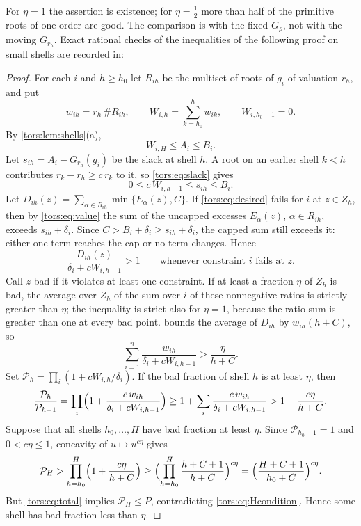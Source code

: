 For $\eta=1$ the assertion is existence; for $\eta=\tfrac12$ more than half of the
primitive roots of one order are good. The comparison is with the fixed $G_\rho$, not with
the moving $G_{r_h}$. Exact rational checks of the inequalities of the following proof
on small shells are recorded in:

\begin{proof}
For each $i$ and $h\ge h_0$ let $R_{ih}$ be the multiset of roots of $g_i$ of valuation
$r_h$, and put
\[
  w_{ih}=r_h\,\#R_{ih},\qquad W_{i,h}=\sum_{k=h_0}^hw_{ik},\qquad W_{i,h_0-1}=0 .
\]
By \cref{tors:lem:shells}(a),
\begin{equation}\label{tors:eq:total}
  W_{i,H}\le A_i\le B_i .
\end{equation}
Let $s_{ih}=A_i-G_{r_h}(g_i)$ be the slack at shell $h$. A root on an earlier shell
$k<h$ contributes $r_k-r_h\ge c\,r_k$ to it, so \eqref{tors:eq:slack} gives
\begin{equation}\label{tors:eq:slackc}
  0\le c\,W_{i,h-1}\le s_{ih}\le B_i .
\end{equation}
Let $D_{ih}(z)=\sum_{\alpha\in R_{ih}}\min\{E_\alpha(z),C\}$. If \eqref{tors:eq:desired}
fails for $i$ at $z\in Z_h$, then by \eqref{tors:eq:value} the sum of the uncapped
excesses $E_\alpha(z)$, $\alpha\in R_{ih}$, exceeds $s_{ih}+\delta_i$. Since
$C>B_i+\delta_i\ge s_{ih}+\delta_i$, the capped sum still exceeds it: either one term
reaches the cap or no term changes. Hence
\[
  \frac{D_{ih}(z)}{\delta_i+cW_{i,h-1}}>1\qquad\text{whenever constraint $i$ fails at }z.
\]
Call $z$ bad if it violates at least one constraint. If at least a fraction $\eta$ of
$Z_h$ is bad, the average over $Z_h$ of the sum over $i$ of these nonnegative ratios is
strictly greater than $\eta$; the inequality is strict also for $\eta=1$, because the
ratio sum is greater than one at every bad point.  bounds the
average of $D_{ih}$ by $w_{ih}(h+C)$, so
\begin{equation}\label{tors:eq:bad}
  \sum_{i=1}^n\frac{w_{ih}}{\delta_i+cW_{i,h-1}}>\frac{\eta}{h+C}.
\end{equation}
Set $\mathcal P_h=\prod_i(1+cW_{i,h}/\delta_i)$. If the bad fraction of shell $h$ is at
least $\eta$, then
\[
  \frac{\mathcal P_h}{\mathcal P_{h-1}}
  =\prod_i\Bigl(1+\frac{c\,w_{ih}}{\delta_i+cW_{i,h-1}}\Bigr)
  \ge1+\sum_i\frac{c\,w_{ih}}{\delta_i+cW_{i,h-1}}>1+\frac{c\eta}{h+C}.
\]
Suppose that all shells $h_0,\dots,H$ have bad fraction at least $\eta$. Since
$\mathcal P_{h_0-1}=1$ and $0<c\eta\le1$, concavity of $u\mapsto u^{c\eta}$ gives
\[
  \mathcal P_H>\prod_{h=h_0}^H\Bigl(1+\frac{c\eta}{h+C}\Bigr)
  \ge\Bigl(\prod_{h=h_0}^H\frac{h+C+1}{h+C}\Bigr)^{c\eta}
  =\Bigl(\frac{H+C+1}{h_0+C}\Bigr)^{c\eta}.
\]
But \eqref{tors:eq:total} implies $\mathcal P_H\le P$, contradicting
\eqref{tors:eq:Hcondition}. Hence some shell has bad fraction less than $\eta$.
\end{proof}

